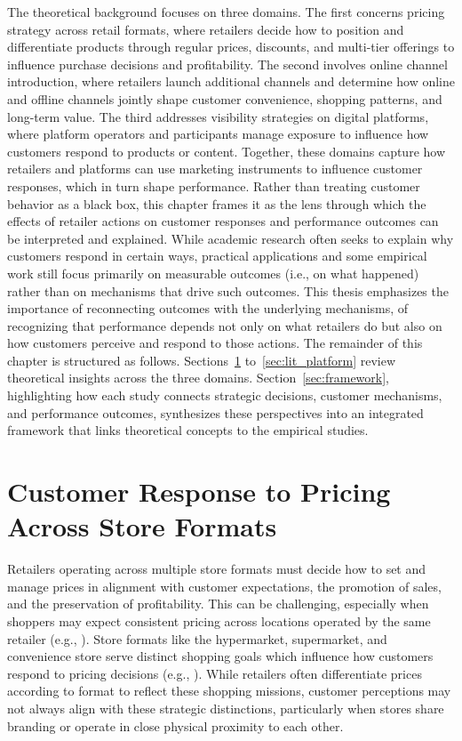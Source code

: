 The theoretical background focuses on three domains. The first concerns pricing strategy across retail formats, where retailers decide how to position and differentiate products through regular prices, discounts, and multi-tier offerings to influence purchase decisions and profitability. The second involves online channel introduction, where retailers launch additional channels and determine how online and offline channels jointly shape customer convenience, shopping patterns, and long-term value. The third addresses visibility strategies on digital platforms, where platform operators and participants manage exposure to influence how customers respond to products or content. Together, these domains capture how retailers and platforms can use marketing instruments to influence customer responses, which in turn shape performance.
Rather than treating customer behavior as a black box, this chapter frames it as the lens through which the effects of retailer actions on customer responses and performance outcomes can be interpreted and explained. While academic research often seeks to explain why customers respond in certain ways, practical applications and some empirical work still focus primarily on measurable outcomes (i.e., on what happened) rather than on mechanisms that drive such outcomes. This thesis emphasizes the importance of reconnecting outcomes with the underlying mechanisms, of recognizing that performance depends not only on what retailers do but also on how customers perceive and respond to those actions.
The remainder of this chapter is structured as follows. Sections~\ref{sec:lit_price} to~\ref{sec:lit_platform} review theoretical insights across the three domains. Section~\ref{sec:framework}, highlighting how each study connects strategic decisions, customer mechanisms, and performance outcomes, synthesizes these perspectives into an integrated framework that links theoretical concepts to the empirical studies.

\section{Customer Response to Pricing Across Store Formats}
\label{sec:lit_price}

Retailers operating across multiple store formats must decide how to set and manage prices in alignment with customer expectations, the promotion of sales, and the preservation of profitability. This can be challenging, especially when shoppers may expect consistent pricing across locations operated by the same retailer (e.g., \cite{Gauri2021-tl}). Store formats like the hypermarket, supermarket, and convenience store serve distinct shopping goals which influence how customers respond to pricing decisions (e.g., \cite{Bonfrer2022-tb}). While retailers often differentiate prices according to format to reflect these shopping missions, customer perceptions may not always align with these strategic distinctions, particularly when stores share branding or operate in close physical proximity to each other.

